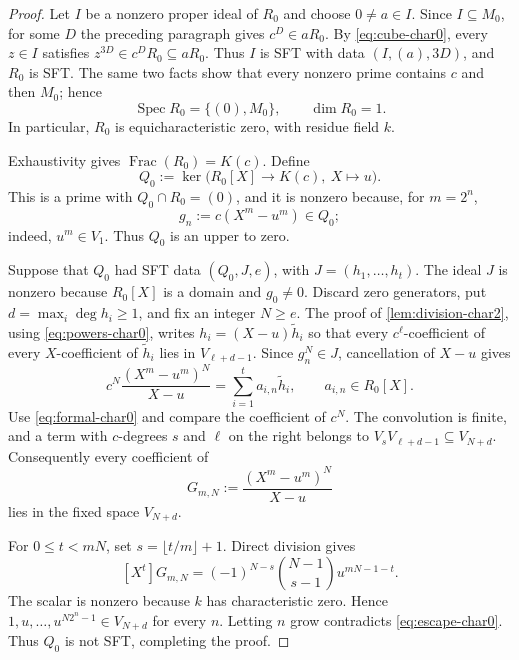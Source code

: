 \documentclass[11pt,reqno]{amsart}
\numberwithin{equation}{section}
\theoremstyle{plain}
\theoremstyle{definition}
\theoremstyle{remark}
\newcommand{\Spec}{\operatorname{Spec}}
\newcommand{\Frac}{\operatorname{Frac}}
\begin{document}
\begin{proof}
Let $I$ be a nonzero proper ideal of $R_0$ and choose $0\neq a\in I$.
Since $I\subseteq M_0$, for some $D$ the preceding paragraph gives
$c^D\in aR_0$.  By
\eqref{eq:cube-char0}, every $z\in I$ satisfies
$z^{3D}\in c^DR_0\subseteq aR_0$.  Thus $I$ is SFT with data
$(I,(a),3D)$, and $R_0$ is SFT.  The same two facts show that every nonzero
prime contains $c$ and then $M_0$; hence
\[
  \Spec R_0=\{(0),M_0\},\qquad \dim R_0=1.
\]
In particular, $R_0$ is equicharacteristic zero, with residue field $k$.

Exhaustivity gives $\Frac(R_0)=K(c)$.  Define
\[
 Q_0:=\ker\bigl(R_0[X]\longrightarrow K(c),\ X\longmapsto u\bigr).
\]
This is a prime with $Q_0\cap R_0=(0)$, and it is nonzero because, for
$m=2^n$,
\begin{equation}\label{eq:gn-char0}
  g_n:=c(X^m-u^m)\in Q_0;
\end{equation}
indeed, $u^m\in V_1$.  Thus $Q_0$ is an upper to zero.

Suppose that $Q_0$ had SFT data $(Q_0,J,e)$, with
$J=(h_1,\ldots,h_t)$.  The ideal $J$ is nonzero because $R_0[X]$ is a
domain and $g_0\neq0$.  Discard zero generators, put
$d=\max_i\deg h_i\geq1$, and fix an integer $N\geq e$.  The proof of
\cref{lem:division-char2}, using \eqref{eq:powers-char0}, writes
$h_i=(X-u)\widetilde h_i$ so that every $c^\ell$-coefficient of every
$X$-coefficient of $\widetilde h_i$ lies in $V_{\ell+d-1}$.
Since $g_n^N\in J$, cancellation of $X-u$ gives
\begin{equation}\label{eq:cancelled-char0}
 c^N\frac{(X^m-u^m)^N}{X-u}
   =\sum_{i=1}^ta_{i,n}\widetilde h_i,
  \qquad a_{i,n}\in R_0[X].
\end{equation}
Use \eqref{eq:formal-char0} and compare the coefficient of $c^N$.
The convolution is finite, and a term with $c$-degrees $s$ and $\ell$ on
the right belongs to $V_sV_{\ell+d-1}\subseteq V_{N+d}$.  Consequently
every coefficient of
\[
  G_{m,N}:=\frac{(X^m-u^m)^N}{X-u}
\]
lies in the fixed space $V_{N+d}$.

For $0\leq t<mN$, set $s=\lfloor t/m\rfloor+1$.  Direct division gives
\begin{equation}\label{eq:coefficients-char0}
 [X^t]G_{m,N}
  =(-1)^{N-s}\binom{N-1}{s-1}u^{mN-1-t}.
\end{equation}
The scalar is nonzero because $k$ has characteristic zero.  Hence
$1,u,\ldots,u^{N2^n-1}\in V_{N+d}$ for every $n$.  Letting $n$ grow
contradicts \eqref{eq:escape-char0}.  Thus $Q_0$ is not SFT, completing
the proof.
\end{proof}
\end{document}
